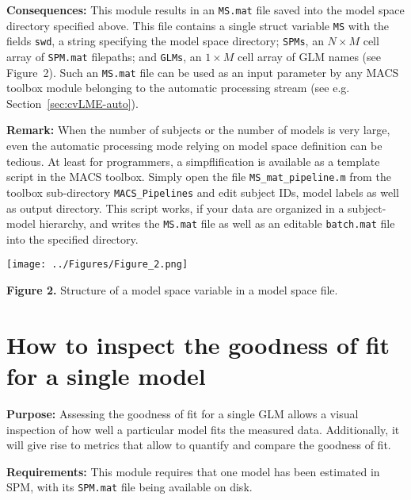 \documentclass[a4paper,12pt]{article}
\begin{document}
\textbf{Consequences:} This module results in an \texttt{MS.mat} file saved into the model space directory specified above. This file contains a single struct variable \texttt{MS} with the fields \texttt{swd}, a string specifying the model space directory; \texttt{SPMs}, an $N \times M$ cell array of \texttt{SPM.mat} filepaths; and \texttt{GLMs}, an $1 \times M$ cell array of GLM names (see Figure~2). Such an \texttt{MS.mat} file can be used as an input parameter by any MACS toolbox module belonging to the automatic processing stream (see e.g. Section~\ref{sec:cvLME-auto}).

\textbf{Remark:} When the number of subjects or the number of models is very large, even the automatic processing mode relying on model space definition can be tedious. At least for programmers, a simpflification is available as a template script in the MACS toolbox. Simply open the file \texttt{MS\_mat\_pipeline.m} from the toolbox sub-directory \texttt{MACS\_Pipelines} and edit subject IDs, model labels as well as output directory. This script works, if your data are organized in a subject-model hierarchy, and writes the \texttt{MS.mat} file as well as an editable \texttt{batch.mat} file into the specified directory.

\vspace{1em}
\begin{flushleft}
\texttt{[image: ../Figures/Figure\_2.png]}
\end{flushleft}
\vspace{-1em}

\textbf{Figure 2.} Structure of a model space variable in a model space file.



\pagebreak
\section[How to inspect the goodness of fit for a single model]{How to inspect the goodness of fit \\ for a single model} \label{sec:GoF}

\textbf{Purpose:} Assessing the goodness of fit for a single GLM allows a visual inspection of how well a particular model fits the measured data. Additionally, it will give rise to metrics that allow to quantify and compare the goodness of fit.

\textbf{Requirements:} This module requires that one model has been estimated in SPM, with its \texttt{SPM.mat} file being available on disk.
\end{document}
